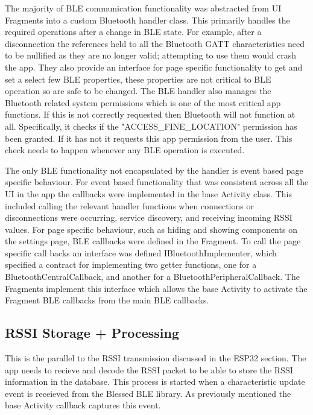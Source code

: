 \documentclass{l4proj}
\begin{document}
The majority of BLE communication functionality was abstracted from UI Fragments into a custom Bluetooth handler class. This primarily handles the required operations after a change in BLE state. For example, after a disconnection the references held to all the Bluetooth GATT characteristics need to be nullified as they are no longer valid; attempting to use them would crash the app. They also provide an interface for page specific functionality to get and set a select few BLE properties, these properties are not critical to BLE operation so are safe to be changed. The BLE handler also manages the Bluetooth related system permissions which is one of the most critical app functions. If this is not correctly requested then Bluetooth will not function at all. Specifically, it checks if the "ACCESS\_FINE\_LOCATION" permission has been granted. If it has not it requests this app permission from the user. This check needs to happen whenever any BLE operation is executed.

The only BLE functionality not encapsulated by the handler is event based page specific behaviour. For event based functionality that was consistent across all the UI in the app the callbacks were implemented in the base Activity class. This included calling the relevant handler functions when connections or disconnections were occurring, service discovery, and receiving incoming RSSI values. For page specific behaviour, such as hiding and showing components on the settings page, BLE callbacks were defined in the Fragment. To call the page specific call backs an interface was defined IBluetoothImplementer, which specified a contract for implementing two getter functions, one for a BluetoothCentralCallback, and another for a BluetoothPeripheralCallback. The Fragments implement this interface which allows the base Activity to activate the Fragment BLE callbacks from the main BLE callbacks.

\subsection{RSSI Storage + Processing}

This is the parallel to the RSSI transmission discussed in the ESP32 section. The app needs to recieve and decode the RSSI packet to be able to store the RSSI information in the database. This process is started when a characteristic update event is receieved from the Blessed BLE library. As previously mentioned the base Activity callback captures this event.
\end{document}
